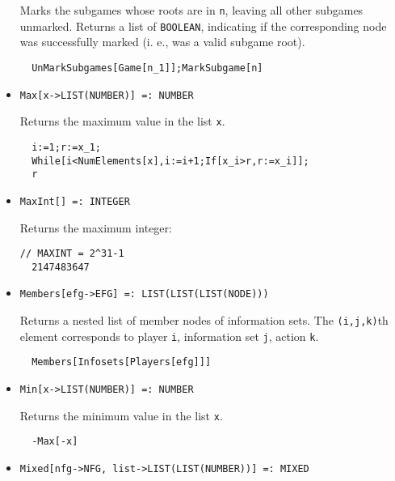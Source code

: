 \begin{itemize}
\bd 
Marks the subgames whose roots are in \verb+n+, leaving all other
subgames unmarked.  Returns a list of \verb+BOOLEAN+, indicating if
the corresponding node was successfully marked (i. e., was a valid
subgame root).
\begin{verbatim}
  UnMarkSubgames[Game[n_1]];MarkSubgame[n]
\end{verbatim} 
\ed

\item{}
\protect \large \begin{verbatim}
Max[x->LIST(NUMBER)] =: NUMBER 
\end{verbatim}\normalsize

\bd 
Returns the maximum value in the list \verb+x+.  
\begin{verbatim}
  i:=1;r:=x_1;
  While[i<NumElements[x],i:=i+1;If[x_i>r,r:=x_i]];
  r
\end{verbatim} 
\ed


\item{}
\protect \large \begin{verbatim}
MaxInt[] =: INTEGER 
\end{verbatim}\normalsize

\bd 
Returns the maximum integer:
\begin{verbatim}
// MAXINT = 2^31-1
  2147483647
\end{verbatim} 
\ed

\item{}
\protect \large \begin{verbatim}
Members[efg->EFG] =: LIST(LIST(LIST(NODE))) 
\end{verbatim}\normalsize

\bd 
Returns a nested list of member nodes of information sets.  The
\verb+(i,j,k)+th element corresponds to player \verb+i+, information
set \verb+j+, action \verb+k+.  
\begin{verbatim}
  Members[Infosets[Players[efg]]]
\end{verbatim} 
\ed

\item{}
\protect \large \begin{verbatim}
Min[x->LIST(NUMBER)] =: NUMBER 
\end{verbatim}\normalsize

\bd 
Returns the minimum value in the list \verb+x+.  
\begin{verbatim}
  -Max[-x]
\end{verbatim} 
\ed

\item{}
\protect \large \begin{verbatim}
Mixed[nfg->NFG, list->LIST(LIST(NUMBER))] =: MIXED 
\end{verbatim}\normalsize


\end{itemize}
